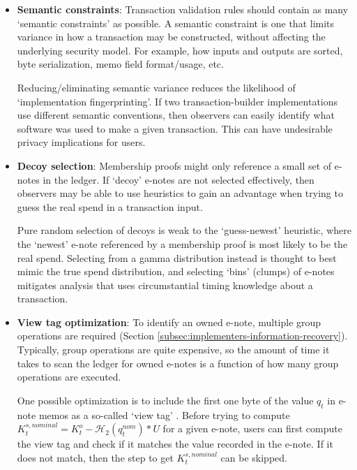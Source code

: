 \begin{itemize}
    \item \textbf{Semantic constraints}: Transaction validation rules should contain as many `semantic constraints' as possible. A semantic constraint is one that limits variance in how a transaction may be constructed, without affecting the underlying security model. For example, how inputs and outputs are sorted, byte serialization, memo field format/usage, etc.

    Reducing/eliminating semantic variance reduces the likelihood of `implementation fingerprinting'. If two transaction-builder implementations use different semantic conventions, then observers can easily identify what software was used to make a given transaction. This can have undesirable privacy implications for users.

    \item \textbf{Decoy selection}: Membership proofs might only reference a small set of e-notes in the ledger. If `decoy' e-notes are not selected effectively, then observers may be able to use heuristics to gain an advantage when trying to guess the real spend in a transaction input.

    Pure random selection of decoys is weak to the `guess-newest' heuristic, where the `newest' e-note referenced by a membership proof is most likely to be the real spend. Selecting from a gamma distribution instead is thought to best mimic the true spend distribution, and selecting `bins' (clumps) of e-notes mitigates analysis that uses circumstantial timing knowledge about a transaction. \cite{AnalysisOfLinkability}

    \item \textbf{View tag optimization}: To identify an owned e-note, multiple group operations are required (Section \ref{subsec:implementers-information-recovery}). Typically, group operations are quite expensive, so the amount of time it takes to scan the ledger for owned e-notes is a function of how many group operations are executed.

    One possible optimization is to include the first one byte of the value $q_t$ in e-note memos as a so-called `view tag' \cite{reduce-scan-times-view-tag-research-issue-73}. Before trying to compute $K^{s,nominal}_t = K^o_t - \mathcal{H}_2(q^{nom}_t)*U$ for a given e-note, users can first compute the view tag and check if it matches the value recorded in the e-note. If it does not match, then the step to get $K^{s,nominal}_t$ can be skipped.


\end{itemize}
